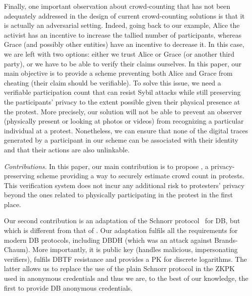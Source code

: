 Finally, one important observation about crowd-counting that has not been adequately addressed in the design of current crowd-counting solutions is that it is actually an adversarial setting. 
Indeed, going back to our example, Alice the activist has an incentive to increase the tallied number of participants, whereas Grace (and possibly other entities) have an incentive to decrease it.
In this case, we are left with two options: either we trust Alice or Grace (or 
another third party), or we have to be able to verify their claims ourselves.
In this paper, our main objective is to provide a scheme preventing both Alice and Grace from cheating (\ie their claim should be verifiable).
To solve this issue, we need a verifiable participation count that can resist Sybil attacks while still preserving the participants'
privacy to the extent possible given their physical presence at the protest. 
More precisely, our solution will not be able to prevent an observer (physically present or looking at photos or videos) from recognizing a particular individual at a protest. 
Nonetheless, we can ensure that none of the digital traces generated by a participant in our scheme can be associated with their identity and that their actions are also unlinkable.

\emph{Contributions.} In this paper, our main contribution is to propose \PRIVO, a privacy-preserving scheme providing a way to securely estimate crowd count in protests.
This verification system does not incur any additional risk to protesters' privacy beyond the ones related to physically participating in the protest in the first place.

Our second contribution is an adaptation of the Schnorr protocol~\cite{Schnorr} 
for \ac{DB}, but which is different from that of \textcite{DistanceBounding}.
Our adaptation fulfils all the requirements for modern \ac{DB} protocols, 
including \ac{DBDH} (which was an attack against Brands-Chaum).
More importantly, it is public key (\ie handles malicious, impersonating 
verifiers), fulfils \ac{DBTF} resistance and provides a \ac{PK} for discrete logarithms.
The latter allows us to replace the use of the plain Schnorr protocol in the 
\ac{ZKPK} used in anonymous credentials and thus we are, to the best of our 
knowledge, the first to provide \ac{DB} anonymous credentials.

